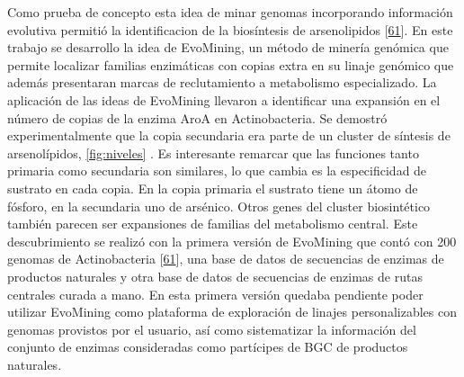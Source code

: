 \documentclass[12pt,twoside]{reedthesis}
\begin{document}
  Como prueba de concepto esta idea de minar genomas incorporando
  información evolutiva permitió la identificacion de la biosíntesis de
  arsenolipidos
  {[}\protect\hyperlink{ref-cruz-morales_phylogenomic_2016}{61}{]}. En
  este trabajo se desarrollo la idea de EvoMining, un método de minería
  genómica que permite localizar familias enzimáticas con copias extra en
  su linaje genómico que además presentaran marcas de reclutamiento a
  metabolismo especializado. La aplicación de las ideas de EvoMining
  llevaron a identificar una expansión en el número de copias de la enzima
  AroA en Actinobacteria. Se demostró experimentalmente que la copia
  secundaria era parte de un cluster de síntesis de arsenolípidos,
  \autoref{fig:niveles} . Es interesante remarcar que las funciones tanto
  primaria como secundaria son similares, lo que cambia es la
  especificidad de sustrato en cada copia. En la copia primaria el
  sustrato tiene un átomo de fósforo, en la secundaria uno de arsénico.
  Otros genes del cluster biosintético también parecen ser expansiones de
  familias del metabolismo central. Este descubrimiento se realizó con la
  primera versión de EvoMining que contó con 200 genomas de Actinobacteria
  {[}\protect\hyperlink{ref-cruz-morales_phylogenomic_2016}{61}{]}, una
  base de datos de secuencias de enzimas de productos naturales y otra
  base de datos de secuencias de enzimas de rutas centrales curada a mano.
  En esta primera versión quedaba pendiente poder utilizar EvoMining como
  plataforma de exploración de linajes personalizables con genomas
  provistos por el usuario, así como sistematizar la información del
  conjunto de enzimas consideradas como partícipes de BGC de productos
  naturales.
  
\end{document}

